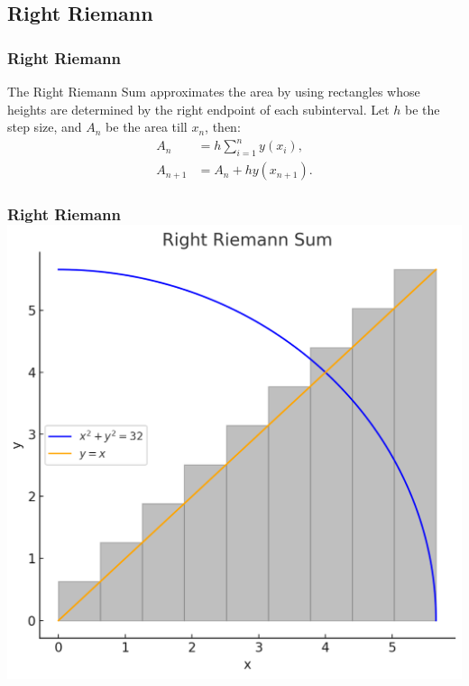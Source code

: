 \documentclass{beamer}
\theoremstyle{remark}
\numberwithin{equation}{section}
\begin{document}
\subsection{Right Riemann}
\begin{frame}
\frametitle{Right Riemann}
The Right Riemann Sum approximates the area by using rectangles whose heights are determined by the right endpoint of each subinterval. Let \(h\) be the step size, and \(A_n\) be the area till \(x_n\), then:
\begin{align}
    A_n &= h\sum_{i=1}^n y(x_i),\\
    A_{n+1} &= A_n + h y(x_{n+1}).
\end{align}
\frametitle{\hspace{0.5em} Right Riemann \hfill \includegraphics[scale=0.1]{figs/2.png}}

\end{frame}
\end{document}
